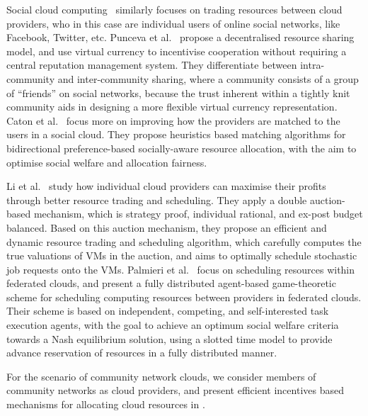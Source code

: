 Social cloud computing~\cite{Caton2014, Punceva2013} similarly focuses on 
trading resources between cloud providers, 
who in this case are individual users of online social networks, like Facebook, Twitter, etc.
Punceva et al.~\cite{Punceva2013} propose a decentralised resource sharing model, and use virtual currency to incentivise cooperation 
without requiring a central reputation management system. 
They differentiate between intra-community and inter-community sharing, 
where a community consists of a group of \enquote{friends} on social networks, 
because the trust inherent within a tightly knit community aids in designing a more flexible virtual currency representation.
Caton et al.~\cite{Caton2014} focus more on improving how the providers are matched to the users in a social cloud.
They propose heuristics based matching algorithms for 
bidirectional preference-based socially-aware resource allocation, 
with the aim to optimise social welfare and allocation fairness.


Li et al.~\cite{Li2013Profit} study how individual cloud providers can maximise their profits through better resource trading and scheduling.
They apply a double auction-based mechanism,
which is strategy proof, individual rational, and ex-post budget balanced. 
Based on this auction mechanism, they propose an efficient and dynamic resource trading and scheduling algorithm, 
which carefully computes the true valuations of VMs in the auction, and aims to
optimally schedule stochastic job requests onto the VMs. 
%
Palmieri et al.~\cite{Palmieri2013Distributed} focus on scheduling resources within federated clouds, 
and present a fully distributed agent-based game-theoretic scheme 
for scheduling computing resources between providers in federated clouds.
Their scheme is based on independent, competing, and self-interested task execution agents, with the goal to achieve an optimum social welfare
criteria towards a Nash equilibrium solution,
using a slotted time model to provide advance reservation of resources in a fully distributed manner. 


For the scenario of community network clouds, 
we consider members of community networks as cloud providers, 
and present efficient incentives based mechanisms for allocating cloud resources in .
